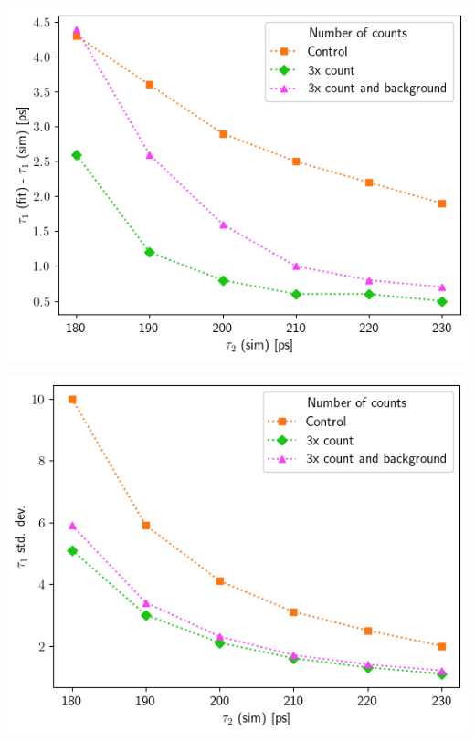 {\begin{minipage}{.47\linewidth}
    \includegraphics[width=\linewidth]{Batch 5/t1-diff 5050.png}
    \label{fig:compcount-t1-5050}
\end{minipage}
\hfill
\begin{minipage}{.47\linewidth}
     
    \includegraphics[width=\linewidth]{Batch 5/t1-err 5050.png}
    \label{fig:compcount-t1err-5050}
\end{minipage}
\begin{minipage}{.47\linewidth}
     

\end{minipage}}
